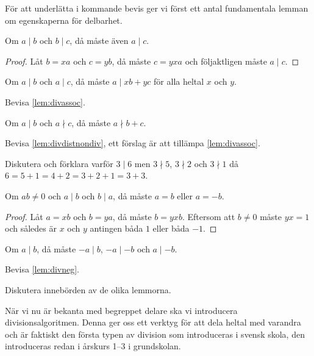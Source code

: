 För att underlätta i kommande bevis ger vi först ett antal fundamentala lemman 
om egenskaperna för delbarhet.
\begin{lemma}\label{lem:divtransitiv}
  Om \(a\mid b\) och \(b\mid c\), då måste även \(a\mid c\).
\end{lemma}
\begin{proof}
  Låt \(b = xa\) och \(c = yb\), då måste \(c = yxa\) och följaktligen måste 
  \(a\mid c\).
\end{proof}
\begin{lemma}\label{lem:divassoc}
  Om \(a\mid b\) och \(a\mid c\), då måste \(a\mid xb + yc\) för alla heltal 
  \(x\) och \(y\).
\end{lemma}
\begin{exercise}
  Bevisa \cref{lem:divassoc}.
\end{exercise}
\begin{lemma}\label{lem:divdistnondiv}
  Om \(a\mid b\) och \(a\nmid c\), då måste \(a\nmid b+c\).
\end{lemma}
\begin{exercise}
  Bevisa \cref{lem:divdistnondiv}, ett förslag är att tillämpa 
  \cref{lem:divassoc}.
\end{exercise}
\begin{exercise}
  Diskutera och förklara varför \(3\mid 6\) men \(3\nmid 5\), \(3\nmid 2\) och 
  \(3\nmid 1\) då \(6 = 5 + 1 = 4 + 2 = 3 + 2 + 1 = 3 + 3\).
\end{exercise}
\begin{lemma}\label{lem:divnoll}
  Om \(ab\neq 0\) och \(a\mid b\) och \(b\mid a\), då måste \(a = b\) eller \(a 
  = -b\).
\end{lemma}
\begin{proof}
  Låt \(a = xb\) och \(b = ya\), då måste \(b = yxb\).
  Eftersom att \(b\neq 0\) måste \(yx = 1\) och således är \(x\) och \(y\) 
  antingen båda \(1\) eller båda \(-1\).
\end{proof}
\begin{lemma}\label{lem:divneg}
  Om \(a\mid b\), då måste \(-a\mid b\), \(-a\mid -b\) och \(a\mid -b\).
\end{lemma}
\begin{exercise}
  Bevisa \cref{lem:divneg}.
\end{exercise}
\begin{exercise}
  Diskutera innebörden av de olika lemmorna.
\end{exercise}

När vi nu är bekanta med begreppet delare ska vi introducera 
divisionsalgoritmen.
Denna ger oss ett verktyg för att dela heltal med varandra och är faktiskt den 
första typen av division som introduceras i svensk skola, den introduceras 
redan i årskurs 1--3 i grundskolan.

